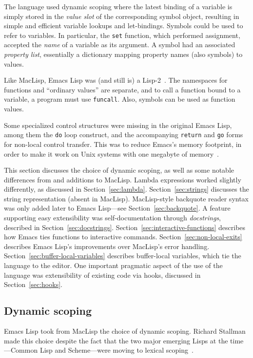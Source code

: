 \documentclass[format=acmsmall, review]{acmart}
\newcommand \Elisp {Emacs Lisp}
\begin{document}
The language used dynamic scoping where the latest binding of a variable is
simply stored in the \emph{value slot} of the corresponding symbol object,
resulting in simple and efficient variable lookups and let-bindings.
Symbols could be used to refer to variables.  In particular, the
\texttt{set} function, which performed assignment, accepted the
\emph{name} of a variable as its argument.  A symbol had an associated
\emph{property list}, essentially a dictionary mapping property
names (also symbols) to values.

Like MacLisp, \Elisp{} was (and still is) a
Lisp-2~\cite{SteeleGabriel1993}.  The namespaces for functions and
``ordinary values'' are separate, and to call a function bound to a
variable, a program must use \texttt{funcall}.  Also, symbols can be
used as function values.

Some specialized control structures were missing in the original
\Elisp{}, among them the \texttt{do} loop construct, and the
accompanying \texttt{return} and \texttt{go} forms for non-local
control transfer.  This was to reduce Emacs's memory footprint, in
order to make it work on Unix systems with one megabyte of memory~\cite{Stallman2018-personal}.

This section discusses the choice of dynamic scoping, as well as
some notable differences from and additions to
MacLisp.  Lambda expressions worked slightly differently, as discussed
in Section~\ref{sec:lambda}.  Section~\ref{sec:strings} discusses the
string representation (absent in MacLisp).
MacLisp-style backquote reader syntax was only added later to \Elisp{}---see Section~\ref{sec:backquote}.
A feature supporting easy extensibility was self-documentation
through \emph{docstrings}, described in
Section~\ref{sec:docstrings}.
Section~\ref{sec:interactive-functions} describes how Emacs ties
functions to interactive commands.
Section~\ref{sec:non-local-exits} describes \Elisp{}'s improvements
over MacLisp's error handling.
Section~\ref{sec:buffer-local-variables} describes buffer-local
variables, which tie the language to the editor.  One important
pragmatic aspect of the use of the language was extensibility of
existing code via hooks, discussed in Section~\ref{sec:hooks}.

\subsection{Dynamic scoping}

\Elisp{} took from MacLisp the choice of dynamic scoping.  Richard
Stallman made this choice despite the fact that the two major emerging
Lisps at the time---Common Lisp and Scheme---were moving to lexical
scoping~\cite{CLtL1,R2RS}.
\end{document}
